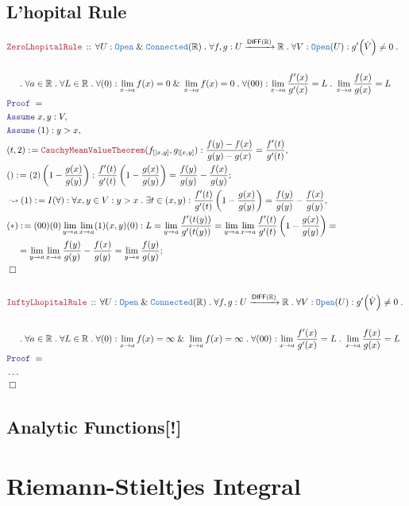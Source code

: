 \documentclass[12pt]{scrartcl}
\newcommand{\TYPE}[1]{\textcolor{NavyBlue}{\mathtt{#1}}}
\newcommand{\LOGIC}[1]{\textcolor{Blue}{\mathtt{#1}}}
\newcommand{\THM}[1]{\textcolor{Maroon}{\mathtt{#1}}}
\renewcommand{\.}{\; . \;}
\newcommand{\de}{: \kern 0.1pc =}
\newcommand{\Theorem}[2]{& \THM{#1} \, :: \, #2 \\ & \Proof = \\ }
\newcommand{\NewLine}{\\ & \kern 1pc}
\newcommand{\Page}[1]{ \begin{align*} #1 \end{align*}   }
\newcommand{\NoProof}{ & \ldots \\ \EndProof}
\renewcommand{\And}{\; \& \;}
\newcommand{\Reals}{\mathbb{R} }
\newcommand{\Say}[3]{& #1 \de #2 : #3, \\}
\newcommand{\Conclude}[3]{& #1 \de #2 : #3; \\}
\newcommand{\Derive}[3]{& \leadsto #1 \de #2 : #3, \\}
\newcommand{\Assume}[2]{& \LOGIC{Assume} \;#1 : #2, \\}
\newcommand{\QED}{\; \square}
\newcommand{\EndProof}{& \QED \\}
\newcommand{\Proof}{\LOGIC{Proof} \; }
\newcommand{\DIFF}{\mathsf{DIFF}}
\begin{document}
\subsection{L'hopital Rule}
\Page{
	\Theorem{ZeroLhopitalRule}{\forall U : \TYPE{Open} \And \TYPE{Connected}(\Reals) \. 
		\forall f,g : U \xrightarrow{\DIFF(\Reals)} \Reals \. \forall V : \TYPE{Open}(U) :
		g'\Big( \dot V  \Big) \neq 0 \.  \NewLine  \NewLine \. \forall a \in \Reals \. \forall L \in \Reals \. 
		\forall (0) : \lim_{x \to a} f(x) = 0 \And \lim_{x \to a} f(x) = 0 \. \forall
		(00) : \lim_{x \to a} \frac{f'(x)}{g'(x)} = L \. \lim_{x \to a} \frac{f(x)}{g(x)} = L
	}
	\Assume{x,y}{V}
	\Assume{(1)}{ y > x}
	\Say{(t,2)}{\THM{CauchyMeanValueTheorem}(f_{[|x,y]},g_{|[x,y]})}{
		\frac{f(y) - f(x)}{g(y) - g(x)} = \frac{f'(t)}{g'(t)}
	}
	\Conclude{()}{(2)\left( 1 - \frac{g(x)}{g(y)}   \right)}
	{
		\frac{f'(t)}{g'(t)}\left( 1 - \frac{g(x)}{g(y)} \right)  =  \frac{f(y)}{g(y)} - \frac{f(x)}{g(y)}
	}
	\Derive{(1)}{I(\forall)}{\forall x,y \in V : y >  x \. \exists t \in (x,y) :
		\frac{f'(t)}{g'(t)}\left( 1 - \frac{g(x)}{g(y)} \right)  =  \frac{f(y)}{g(y)} - \frac{f(x)}{g(y)}
	}
	\Conclude{(*)}{ (00)(0)\lim_{y \to a} \lim_{x \to a} (1)(x,y)(0)}
	{
		L = \lim_{y \to a} \frac{f'(t(y))}{g'(t(y))} = 
		\lim_{y \to a} \lim_{x \to a} \frac{f'(t)}{g'(t)}\left(  1 - \frac{g(x)}{g(y)}    \right) =
		\NewLine 
		=  \lim_{y \to a} \lim_{x \to a} \frac{f(y)}{g(y)} - \frac{f(x)}{g(y)} =
		\lim_{y \to a} \frac{f(y)}{g(y)}
	}
	\EndProof
	\\
	\Theorem{InftyLhopitalRule}{\forall U : \TYPE{Open} \And \TYPE{Connected}(\Reals) \. 
		\forall f,g : U \xrightarrow{\DIFF(\Reals)} \Reals \. \forall V : \TYPE{Open}(U) :
		g'\Big( \dot V  \Big) \neq 0 \.  \NewLine  \NewLine \. \forall a \in \Reals \. \forall L \in \Reals \. 
		\forall (0) : \lim_{x \to a} f(x) = \infty \And \lim_{x \to a} f(x) = \infty \. \forall
		(00) : \lim_{x \to a} \frac{f'(x)}{g'(x)} = L \. \lim_{x \to a} \frac{f(x)}{g(x)} = L
	}
	\NoProof	
}
\newpage
\subsection{Analytic Functions[!]}
\newpage
\section{Riemann-Stieltjes  Integral}
\end{document}
